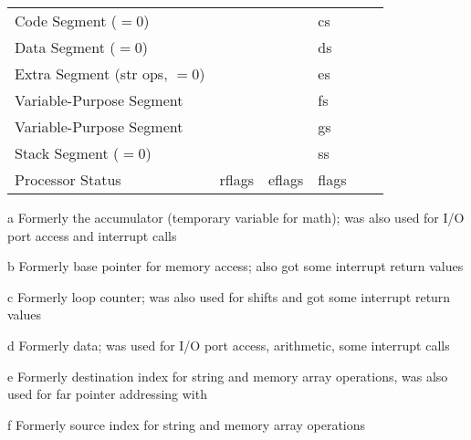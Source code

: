 \begin{table*}
\begin{threeparttable}
\begin{tabular}{lAAAAA}
      Code Segment ($=0$) &&& cs && \\
      Data Segment ($=0$) &&& ds && \\
      Extra Segment (str ops, $=0$) &&& es && \\
      Variable-Purpose Segment &&& fs && \\
      Variable-Purpose Segment &&& gs && \\
      Stack Segment ($=0$) &&& ss && \\
      Processor Status & rflags & eflags & flags && \\
      \bottomrule
    \end{tabular}
    \begin{tablenotes}
      \item[a] Formerly the accumulator (temporary variable for math);%
        was also used for I/O port access and interrupt calls
      \item[b] Formerly base pointer for memory access;%
        also got some interrupt return values
      \item[c] Formerly loop counter;%
        was also used for shifts and got some interrupt return values
      \item[d] Formerly data;%
        was used for I/O port access, arithmetic, some interrupt calls
      \item[e] Formerly destination index for string and memory array operations,
        was also used for far pointer addressing with 
      \item[f] Formerly source index for string and memory array operations
    \end{tablenotes}
  \end{threeparttable}
\end{table*}

